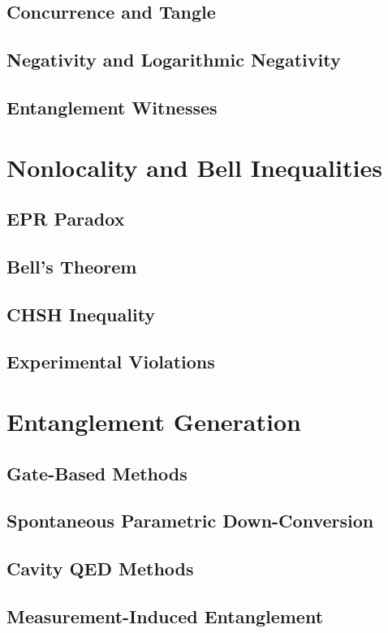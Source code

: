 \documentclass[12pt,a4paper]{book}
\begin{document}
\subsection{Concurrence and Tangle}
\subsection{Negativity and Logarithmic Negativity}
\subsection{Entanglement Witnesses}

\section{Nonlocality and Bell Inequalities}
\subsection{EPR Paradox}
\subsection{Bell's Theorem}
\subsection{CHSH Inequality}
\subsection{Experimental Violations}

\section{Entanglement Generation}
\subsection{Gate-Based Methods}
\subsection{Spontaneous Parametric Down-Conversion}
\subsection{Cavity QED Methods}
\subsection{Measurement-Induced Entanglement}
\end{document}
